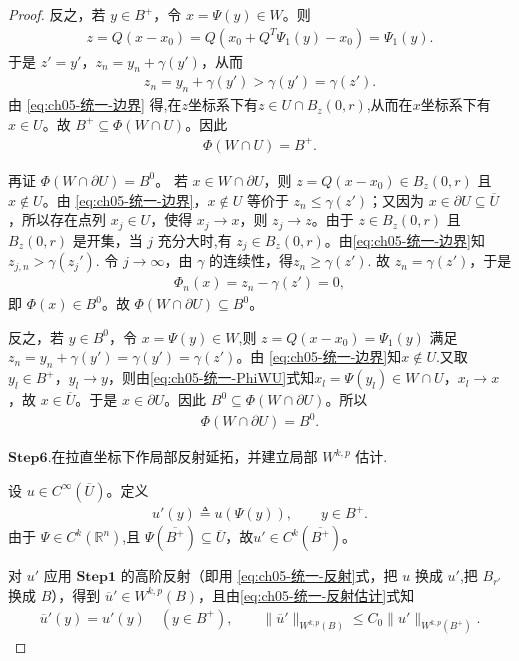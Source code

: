 \documentclass[../../main.tex]{subfiles}
\begin{document}
\begin{proof}
反之，若 $y\in B^{+}$，令 $x=\Psi(y)\in W$。则
\begin{align*}
z=Q(x-x_0)=Q(x_0+Q^{T}\Psi_1(y)-x_0)=\Psi_1(y).
\end{align*}
于是 $z'=y'$，$z_n=y_n+\gamma(y')$，从而
\begin{align*}
z_n=y_n+\gamma(y')>\gamma(y')=\gamma(z').
\end{align*}
由 \eqref{eq:ch05-统一-边界} 得,在$z$坐标系下有$z\in U\cap B_z(0,r)$,从而在$x$坐标系下有$x\in U$。故 $B^{+}\subseteq\Phi(W\cap U)$。因此
\begin{align}
\Phi(W\cap U)=B^{+}.
\label{eq:ch05-统一-PhiWU}
\end{align}

再证 $\Phi(W\cap\partial U)=B^{0}$。
若 $x\in W\cap\partial U$，则 $z=Q(x-x_0)\in B_z(0,r)$ 且 $x\notin U$。由 \eqref{eq:ch05-统一-边界}，$x\notin U$ 等价于 $z_n\leqslant\gamma(z')$；又因为 $x\in\partial U\subseteq\overline U$，所以存在点列 $x_j\in U$，使得 $x_j\to x$，则 $z_j\to z$。由于 $z\in B_z(0,r)$ 且 $B_z(0,r)$ 是开集，当 $j$ 充分大时,有 $z_j\in B_z(0,r)$。由\eqref{eq:ch05-统一-边界}知
$z_{j,n}>\gamma(z_j').$
令 $j\to\infty$，由 $\gamma$ 的连续性，得$z_n\geqslant\gamma(z').$
故 $z_n=\gamma(z')$，于是
\begin{align*}
\Phi_n(x)=z_n-\gamma(z')=0,
\end{align*}
即 $\Phi(x)\in B^{0}$。故 $\Phi(W\cap\partial U)\subseteq B^{0}$。

反之，若 $y\in B^{0}$，令 $x=\Psi(y)\in W$,则 $z=Q(x-x_0)=\Psi_1(y)$ 满足 $z_n=y_n+\gamma(y')=\gamma(y')=\gamma(z')$。由 \eqref{eq:ch05-统一-边界}知$x\notin U$.又取 $y_l\in B^{+}$，$y_l\to y$，则由\eqref{eq:ch05-统一-PhiWU}式知$x_l=\Psi(y_l)\in W\cap U$，$x_l\to x$，故 $x\in\overline{U}$。于是 $x\in\partial U$。因此 $B^{0}\subseteq\Phi(W\cap\partial U)$。所以
\begin{align}
\Phi(W\cap\partial U)=B^{0}.
\label{eq:ch05-统一-PhiWbU}
\end{align}

\noindent$\mathbf{Step}\bm{6}$.{\heiti 在拉直坐标下作局部反射延拓，并建立局部 $W^{k,p}$ 估计.}

设 $u\in C^{\infty}(\overline{U})$。定义
\begin{align*}
u'(y)\triangleq u(\Psi(y)),\qquad y\in B^{+}.
\end{align*}
由于 $\Psi\in C^{k}(\mathbb{R}^n)$,且 $\Psi(\overline{B^{+}})\subseteq\overline{U}$，故$u'\in C^{k}(\overline{B^{+}})$。

对 $u'$ 应用 $\mathbf{Step}\bm{1}$ 的高阶反射（即用 \eqref{eq:ch05-统一-反射}式，把 $u$ 换成 $u'$,把 $B_{r'}$ 换成 $B$），得到 $\overline{u}'\in W^{k,p}(B)$，且由\eqref{eq:ch05-统一-反射估计}式知
\begin{align}
\overline{u}'(y)=u'(y)\quad(y\in B^{+}),\qquad
\|\overline{u}'\|_{W^{k,p}(B)}\leqslant C_0\|u'\|_{W^{k,p}(B^{+})}.
\label{eq:ch05-统一-局部反射}
\end{align}


\end{proof}
\end{document}
